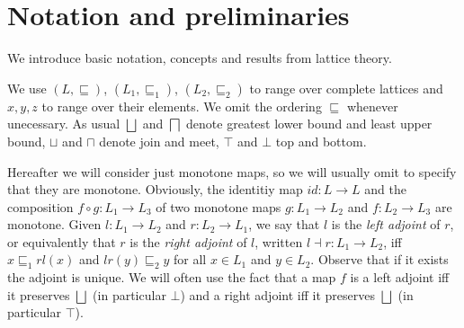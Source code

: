 \documentclass[smallcondensed,envcountsect,envcountsame]{svjour3}     %
\begin{document}
%
%
%


\section{Notation and preliminaries}
%
We introduce basic notation, concepts and results from lattice theory.

We use $(L,\sqsubseteq)$, $(L_1,\sqsubseteq_1)$, $(L_2,\sqsubseteq_2)$ to range over complete lattices and $x,y,z$ to range over their elements. We omit the ordering $\sqsubseteq$ whenever unecessary. As usual $\bigsqcup$ and $\bigsqcap$ denote greatest lower bound and least upper bound, $\sqcup$ and $\sqcap$ denote join and meet, $\top$ and $\bot$ top and bottom.

Hereafter we will consider just monotone maps, so we will usually omit to specify that they are monotone. Obviously, the identitiy map $id\colon L\to L$ and the composition $f\circ g \colon L_1\to L_3$ of two monotone maps $g\colon L_1\to L_2$ and  $f\colon L_2\to L_3$  are monotone. Given $l \colon L_1 \to L_2$ and $r\colon L_2\to L_1$, we say that $l$ is the \emph{left adjoint} of $r$, or equivalently that $r$ is the \emph{right adjoint} of $l$, written $l\dashv r \colon L_1\to L_2$, iff $x\sqsubseteq_1 rl(x)$ and $lr(y) \sqsubseteq_2 y$ for all $x\in L_1$ and $y\in L_2$. Observe that if it exists the adjoint is unique. We will often use the fact that a map $f$ is a left adjoint iff it preserves $\bigsqcup$ (in particular $\bot$) and a right adjoint iff it preserves $\bigsqcup$ (in particular $\top$).
\end{document}
